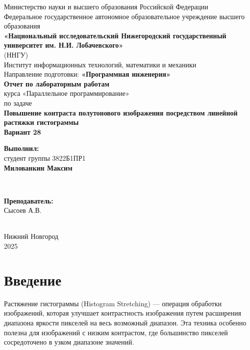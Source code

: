 \documentclass[a4paper,14pt]{article}
\begin{document}
\begin{titlepage}
    \centering
    \large
    Министерство науки и высшего образования Российской Федерации\\[0.5cm]
    Федеральное государственное автономное образовательное учреждение высшего образования\\[0.5cm]
    \textbf{«Национальный исследовательский Нижегородский государственный университет им. Н.И. Лобачевского»}\\
    (ННГУ)\\[1cm]
    Институт информационных технологий, математики и механики\\[0.5cm]
    Направление подготовки: \textbf{«Программная инженерия»}\\[1.5cm]

    \vfill
    {\LARGE \textbf{Отчет по лабораторным работам }}\\[0.5cm]
    {\Large курса «Параллельное программирование» }\\[0.5cm]
    {\Large по задаче}\\[0.5cm]
    {\LARGE \textbf{Повышение контраста полутонового изображения посредством линейной растяжки гистограммы}}\\[0.5cm]
    {\Large \textbf{Вариант 28}}\\[2.5cm]

    \hfill\parbox{0.5\textwidth}{
        \textbf{Выполнил:} \\
        студент группы 3822Б1ПР1 \\
        \textbf{Милованкин Максим}
    }\\[0.5cm]

    \hfill\parbox{0.5\textwidth}{
        \textbf{Преподаватель:} \\
        Сысоев А.В.

    }\\[2cm]
    
    \vfill
    { Нижний Новгород } \\
    { 2025 }
\end{titlepage}

\section{Введение}

Растяжение гистограммы (Histogram Stretching) — операция обработки изображений, которая улучшает контрастность изображения путем расширения диапазона яркости пикселей на весь возможный диапазон. Эта техника особенно полезна для изображений с низким контрастом, где большинство пикселей сосредоточено в узком диапазоне значений.
\end{document}
